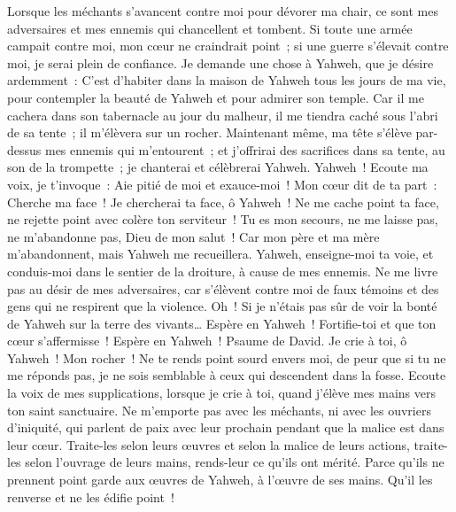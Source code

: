 \begin{multicols}{2}
Lorsque les méchants s'avancent contre moi pour dévorer ma chair, ce sont mes adversaires et mes ennemis qui chancellent et tombent.
Si toute une armée campait contre moi, mon cœur ne craindrait point~; si une guerre s'élevait contre moi, je serai plein de confiance.
Je demande une chose à Yahweh, que je désire ardemment~: C'est d'habiter dans la maison de Yahweh tous les jours de ma vie, pour contempler la beauté de Yahweh et pour admirer son temple.
Car il me cachera dans son tabernacle au jour du malheur, il me tiendra caché sous l'abri de sa tente~; il m'élèvera sur un rocher.
Maintenant même, ma tête s'élève par-dessus mes ennemis qui m'entourent~; et j'offrirai des sacrifices dans sa tente, au son de la trompette~; je chanterai et célèbrerai Yahweh.
Yahweh~! Ecoute ma voix, je t'invoque~: Aie pitié de moi et exauce-moi~!
Mon cœur dit de ta part~: Cherche ma face~! Je chercherai ta face, ô Yahweh~!
Ne me cache point ta face, ne rejette point avec colère ton serviteur~! Tu es mon secours, ne me laisse pas, ne m'abandonne pas, Dieu de mon salut~!
Car mon père et ma mère m'abandonnent, mais Yahweh me recueillera.
Yahweh, enseigne-moi ta voie, et conduis-moi dans le sentier de la droiture, à cause de mes ennemis.
Ne me livre pas au désir de mes adversaires, car s'élèvent contre moi de faux témoins et des gens qui ne respirent que la violence.
Oh~! Si je n'étais pas sûr de voir la bonté de Yahweh sur la terre des vivants…
Espère en Yahweh~! Fortifie-toi et que ton cœur s'affermisse~! Espère en Yahweh~!
\VerseOne{}Psaume de David. Je crie à toi, ô Yahweh~! Mon rocher~! Ne te rends point sourd envers moi, de peur que si tu ne me réponds pas, je ne sois semblable à ceux qui descendent dans la fosse.
Ecoute la voix de mes supplications, lorsque je crie à toi, quand j'élève mes mains vers ton saint sanctuaire.
Ne m'emporte pas avec les méchants, ni avec les ouvriers d'iniquité, qui parlent de paix avec leur prochain pendant que la malice est dans leur cœur.
Traite-les selon leurs œuvres et selon la malice de leurs actions, traite-les selon l'ouvrage de leurs mains, rends-leur ce qu'ils ont mérité.
Parce qu'ils ne prennent point garde aux œuvres de Yahweh, à l'œuvre de ses mains. Qu'il les renverse et ne les édifie point~!

\end{multicols}
